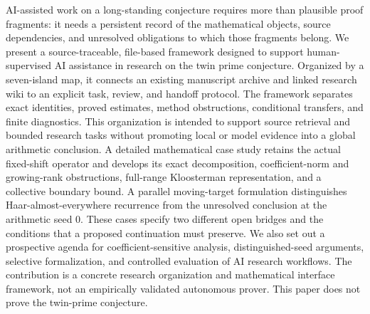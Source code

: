AI-assisted work on a long-standing conjecture requires more than plausible proof fragments: it needs a persistent record of the mathematical objects, source dependencies, and unresolved obligations to which those fragments belong. We present a source-traceable, file-based framework designed to support human-supervised AI assistance in research on the twin prime conjecture. Organized by a seven-island map, it connects an existing manuscript archive and linked research wiki to an explicit task, review, and handoff protocol. The framework separates exact identities, proved estimates, method obstructions, conditional transfers, and finite diagnostics. This organization is intended to support source retrieval and bounded research tasks without promoting local or model evidence into a global arithmetic conclusion. A detailed mathematical case study retains the actual fixed-shift operator and develops its exact decomposition, coefficient-norm and growing-rank obstructions, full-range Kloosterman representation, and a collective boundary bound. A parallel moving-target formulation distinguishes Haar-almost-everywhere recurrence from the unresolved conclusion at the arithmetic seed $0$. These cases specify two different open bridges and the conditions that a proposed continuation must preserve. We also set out a prospective agenda for coefficient-sensitive analysis, distinguished-seed arguments, selective formalization, and controlled evaluation of AI research workflows. The contribution is a concrete research organization and mathematical interface framework, not an empirically validated autonomous prover. This paper does not prove the twin-prime conjecture.
